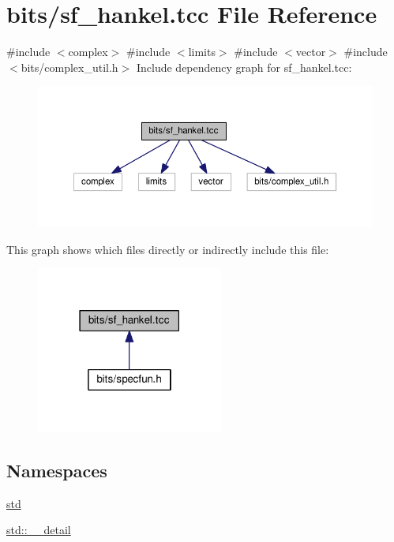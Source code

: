 \hypertarget{sf__hankel_8tcc}{}\section{bits/sf\+\_\+hankel.tcc File Reference}
\label{sf__hankel_8tcc}
{\ttfamily \#include $<$complex$>$}\newline
{\ttfamily \#include $<$limits$>$}\newline
{\ttfamily \#include $<$vector$>$}\newline
{\ttfamily \#include $<$bits/complex\+\_\+util.\+h$>$}\newline
Include dependency graph for sf\+\_\+hankel.\+tcc\+:
\nopagebreak
\begin{figure}[H]
\begin{center}
\leavevmode
\includegraphics[width=350pt]{sf__hankel_8tcc__incl}
\end{center}
\end{figure}
This graph shows which files directly or indirectly include this file\+:
\nopagebreak
\begin{figure}[H]
\begin{center}
\leavevmode
\includegraphics[width=174pt]{sf__hankel_8tcc__dep__incl}
\end{center}
\end{figure}
\subsection*{Namespaces}
\begin{DoxyCompactItemize}
\item 
 \hyperlink{namespacestd}{std}
\item 
 \hyperlink{namespacestd_1_1____detail}{std\+::\+\_\+\+\_\+detail}
\end{DoxyCompactItemize}
